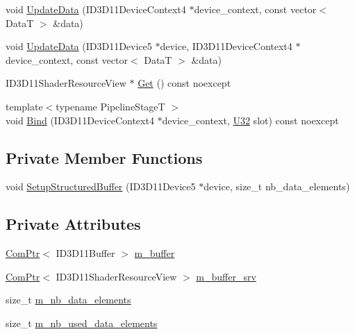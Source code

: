 \begin{DoxyCompactItemize}
\item 
void \hyperlink{structmage_1_1_structured_buffer_ae7cc4d45f8303c7d9e1b2c2b3e485714}{Update\+Data} (I\+D3\+D11\+Device\+Context4 $\ast$device\+\_\+context, const vector$<$ DataT $>$ \&data)
\item 
void \hyperlink{structmage_1_1_structured_buffer_adc0f3c674603cc8e852080f3fade1155}{Update\+Data} (I\+D3\+D11\+Device5 $\ast$device, I\+D3\+D11\+Device\+Context4 $\ast$device\+\_\+context, const vector$<$ DataT $>$ \&data)
\item 
I\+D3\+D11\+Shader\+Resource\+View $\ast$ \hyperlink{structmage_1_1_structured_buffer_ad933738bc55b10aea665913a8215bab0}{Get} () const noexcept
\item 
{\footnotesize template$<$typename Pipeline\+StageT $>$ }\\void \hyperlink{structmage_1_1_structured_buffer_ae3884b12cbf30188089481b39fefa4c2}{Bind} (I\+D3\+D11\+Device\+Context4 $\ast$device\+\_\+context, \hyperlink{namespacemage_a41c104c036fba3756a74e19f793eeaa1}{U32} slot) const noexcept
\end{DoxyCompactItemize}
\subsection*{Private Member Functions}
\begin{DoxyCompactItemize}
\item 
void \hyperlink{structmage_1_1_structured_buffer_aa970b9b1ce5dc7620693f994afcd2faa}{Setup\+Structured\+Buffer} (I\+D3\+D11\+Device5 $\ast$device, size\+\_\+t nb\+\_\+data\+\_\+elements)
\end{DoxyCompactItemize}
\subsection*{Private Attributes}
\begin{DoxyCompactItemize}
\item 
\hyperlink{namespacemage_ae74f374780900893caa5555d1031fd79}{Com\+Ptr}$<$ I\+D3\+D11\+Buffer $>$ \hyperlink{structmage_1_1_structured_buffer_adbd113ab2fe539e34587887876fe3825}{m\+\_\+buffer}
\item 
\hyperlink{namespacemage_ae74f374780900893caa5555d1031fd79}{Com\+Ptr}$<$ I\+D3\+D11\+Shader\+Resource\+View $>$ \hyperlink{structmage_1_1_structured_buffer_a94f811f1d36cf63dad600e6f89dcc40b}{m\+\_\+buffer\+\_\+srv}
\item 
size\+\_\+t \hyperlink{structmage_1_1_structured_buffer_a92c53203287f6ef5ab8ed88c7b588e72}{m\+\_\+nb\+\_\+data\+\_\+elements}
\item 
size\+\_\+t \hyperlink{structmage_1_1_structured_buffer_a8c69058d2ce956c7c1690a45e1bffb34}{m\+\_\+nb\+\_\+used\+\_\+data\+\_\+elements}
\end{DoxyCompactItemize}


